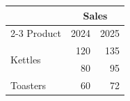 \documentclass{article}
\begin{document}
\begin{tabular}{|l|r|r|}
\hline
 & \multicolumn{2}{c|}{Sales} \\
\cline{2-3}
Product & 2024 & 2025 \\
\hline
\multirow{2}{*}{Kettles} & 120 & 135 \\
\cline{2-3}
 & 80 & 95 \\
\hline
Toasters & 60 & 72 \\
\hline
\end{tabular}
\end{document}
